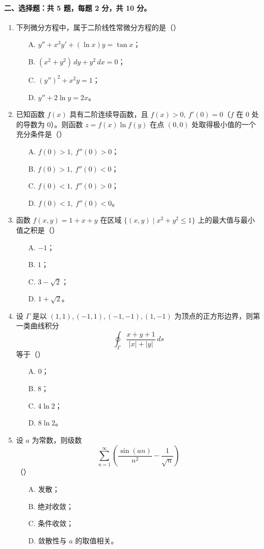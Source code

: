 \paragraph*{二、选择题：共 5 题，每题 2 分，共 10 分。}
\begin{enumerate}
  \item 下列微分方程中，属于二阶线性常微分方程的是（\quad）
  \begin{enumerate}
    \item[A.] $y''+x^3y'+(\ln x)y=\tan x$；
    \item[B.] $(x^2+y^2)\,dy+y^2\,dx=0$；
    \item[C.] $(y'')^2+x^2y=1$；
    \item[D.] $y''+2\ln y=2x$。
  \end{enumerate}
  \item 已知函数 $f(x)$ 具有二阶连续导函数，且 $f(x)>0,\ f'(0)=0$（$f$ 在 $0$ 处的导数为 $0$）。则函数 $z=f(x)\ln f(y)$ 在点 $(0,0)$ 处取得极小值的一个充分条件是（\quad）
  \begin{enumerate}
    \item[A.] $f(0)>1,\ f''(0)>0$；
    \item[B.] $f(0)>1,\ f''(0)<0$；
    \item[C.] $f(0)<1,\ f''(0)>0$；
    \item[D.] $f(0)<1,\ f''(0)<0$。
  \end{enumerate}
  \item 函数 $f(x,y)=1+x+y$ 在区域 $\{(x,y)\mid x^2+y^2\le 1\}$ 上的最大值与最小值之积是（\quad）
  \begin{enumerate}
    \item[A.] $-1$；
    \item[B.] $1$；
    \item[C.] $3-\sqrt2$；
    \item[D.] $1+\sqrt2$。
  \end{enumerate}
  \item 设 $\Gamma$ 是以 $(1,1),(-1,1),(-1,-1),(1,-1)$ 为顶点的正方形边界，则第一类曲线积分
  \[
    \oint_\Gamma \frac{x+y+1}{|x|+|y|}\,ds
  \]
  等于（\quad）
  \begin{enumerate}
    \item[A.] $0$；
    \item[B.] $8$；
    \item[C.] $4\ln 2$；
    \item[D.] $8\ln 2$。
  \end{enumerate}
  \item 设 $a$ 为常数，则级数
  \[
    \sum_{n=1}^{\infty}\left(\frac{\sin(an)}{n^2}-\frac1{\sqrt n}\right)
  \]
  （\quad）
  \begin{enumerate}
    \item[A.] 发散；
    \item[B.] 绝对收敛；
    \item[C.] 条件收敛；
    \item[D.] 敛散性与 $a$ 的取值相关。
  \end{enumerate}
\end{enumerate}

